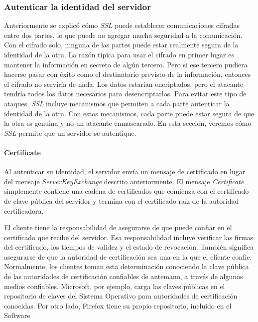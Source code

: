\subsubsection*{Autenticar la identidad del servidor}
Anteriormente se explicó cómo \emph{SSL} puede establecer comunicaciones 
cifradas entre dos partes, lo que puede no agregar mucha seguridad a 
la comunicación. Con el cifrado solo, ninguna de las partes puede 
estar realmente segura de la identidad de la otra. La razón típica 
para usar el cifrado en primer lugar es mantener la información en 
secreto de algún tercero. Pero si ese tercero pudiera hacerse pasar 
con éxito como el destinatario previsto de la información, entonces el 
cifrado no serviría de nada. Los datos estarían encriptados, pero el 
atacante tendría todos los datos necesarios para desencriptarlos. Para 
evitar este tipo de ataques, \emph{SSL} incluye mecanismos que permiten a cada 
parte autenticar la identidad de la otra. Con estos mecanismos, cada 
parte puede estar segura de que la otra es genuina y no un atacante 
enmascarado. En esta sección, veremos cómo \emph{SSL} permite que un servidor 
se autentique.

\paragraph*{Certificate}
Al autenticar su identidad, el servidor envía un mensaje de certificado 
en lugar del mensaje \emph{ServerKeyExchange} descrito anteriormente. El mensaje 
\emph{Certificate} simplemente contiene una cadena de certificados que comienza 
con el certificado de clave pública del servidor y termina con el certificado 
raíz de la autoridad certificadora.

El cliente tiene la responsabilidad de asegurarse de que puede confiar 
en el certificado que recibe del servidor. Esa responsabilidad incluye 
verificar las firmas del certificado, los tiempos de validez y el estado 
de revocación. También significa asegurarse de que la autoridad de 
certificación sea una en la que el cliente confíe. Normalmente, los clientes 
toman esta determinación conociendo la clave pública de las autoridades de 
certificación confiables de antemano, a través de algunos medios confiables. 
Microsoft, por ejemplo, carga las claves públicas en el repositorio de claves 
del Sistema Operativo para autoridades de certificación conocidas. Por otro 
lado, Firefox tiene su propio repositorio, incluido en el Software

